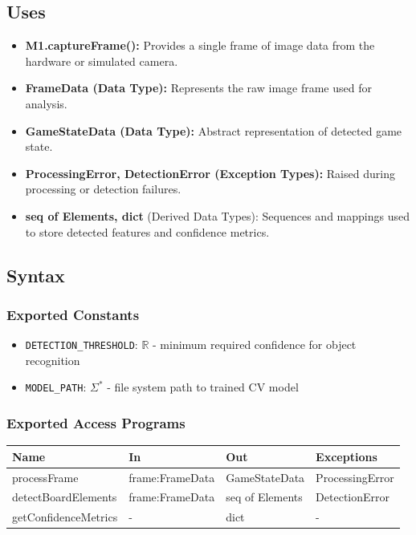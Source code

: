\documentclass[12pt, titlepage]{article}
\begin{document}
\subsection{Uses}
\begin{itemize}
    \item \textbf{M1.captureFrame():} Provides a single frame of image data from the hardware or simulated camera.
    \item \textbf{FrameData (Data Type):} Represents the raw image frame used for analysis.
    \item \textbf{GameStateData (Data Type):} Abstract representation of detected game state.
    \item \textbf{ProcessingError, DetectionError (Exception Types):} Raised during processing or detection failures.
    \item \textbf{seq of Elements, dict} (Derived Data Types):  
          Sequences and mappings used to store detected features and confidence metrics.
\end{itemize}

\subsection{Syntax}

\subsubsection{Exported Constants}
\begin{itemize}
\item \texttt{DETECTION\_THRESHOLD}: $\mathbb{R}$ - minimum required confidence for object recognition
\item \texttt{MODEL\_PATH}: $\Sigma^{*}$ - file system path to trained CV model
\end{itemize}

\subsubsection{Exported Access Programs}
\begin{center}
\begin{tabular}{p{5cm} p{4cm} p{4cm} p{3cm}}
\hline
\textbf{Name} & \textbf{In} & \textbf{Out} & \textbf{Exceptions} \\
\hline
processFrame & frame:FrameData & GameStateData & ProcessingError \\
detectBoardElements & frame:FrameData & seq of Elements & DetectionError \\
getConfidenceMetrics & - & dict & - \\
\hline
\end{tabular}
\end{center}
\end{document}
